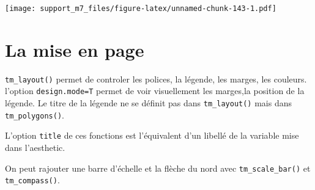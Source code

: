 \documentclass[
]{book}
\begin{document}
\texttt{[image: support\_m7\_files/figure-latex/unnamed-chunk-143-1.pdf]}

\hypertarget{la-mise-en-page}{%
\section{La mise en page}\label{la-mise-en-page}}

\texttt{tm\_layout()} permet de controler les polices, la légende, les marges, les couleurs.
l'option \texttt{design.mode=T} permet de voir visuellement les marges,la position de la légende.
Le titre de la légende ne se définit pas dans \texttt{tm\_layout()} mais dans \texttt{tm\_polygons()}.

L'option \texttt{title} de ces fonctions est l'équivalent d'un libellé de la variable mise dans l'aesthetic.

On peut rajouter une barre d'échelle et la flèche du nord avec \texttt{tm\_scale\_bar()} et \texttt{tm\_compass()}.
\end{document}
